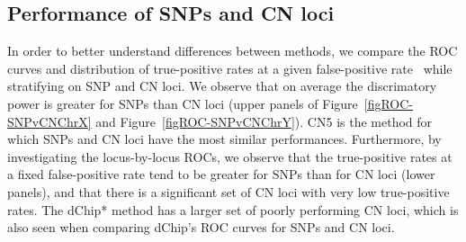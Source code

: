 \documentclass{bioinfo}
\newcommand{\TPrates}{true-positive rates\xspace}
\newcommand{\FPrate}{false-positive rate\xspace}
\begin{document}
\subsection{Performance of SNPs and CN loci}
In order to better understand differences between methods, we compare the ROC curves and distribution of \TPrates at a given \FPrate~\citep{BengtssonH_etal_2008a} while stratifying on SNP and CN loci.
We observe that on average the discrimatory power is greater for SNPs than CN loci (upper panels of Figure~\ref{figROC-SNPvCNChrX} and Figure~\ref{figROC-SNPvCNChrY}).  CN5 is the method for which SNPs and CN loci have the most similar performances.   Furthermore, by investigating the locus-by-locus ROCs, we observe that the \TPrates at a fixed \FPrate tend to be greater for SNPs than for CN loci (lower panels), and that there is a significant set of CN loci with very low \TPrates.  The dChip* method has a larger set of poorly performing CN loci, which is also seen when comparing dChip's ROC curves for SNPs and CN loci.  
\end{document}
